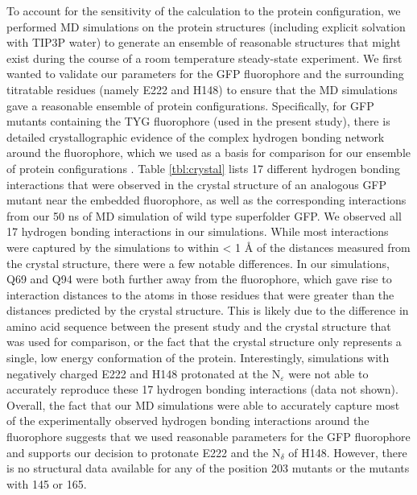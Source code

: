 To account for the sensitivity of the calculation to the protein configuration, we performed MD simulations on the protein structures (including explicit solvation with TIP3P water) to generate an ensemble of reasonable structures that might exist during the course of a room temperature steady-state experiment.
We first wanted to validate our parameters for the GFP fluorophore and the surrounding titratable residues (namely E222 and H148) to ensure that the MD simulations gave a reasonable ensemble of protein configurations.
Specifically, for GFP mutants containing the TYG fluorophore (used in the present study), there is detailed crystallographic evidence of the complex hydrogen bonding network around the fluorophore, which we used as a basis for comparison for our ensemble of protein configurations \cite{Elsliger1999}.
Table \ref{tbl:crystal} lists 17 different hydrogen bonding interactions that were observed in the crystal structure of an analogous GFP mutant near the embedded fluorophore, as well as the corresponding interactions from our 50 \si{\ns} of MD simulation of wild type superfolder GFP.
We observed all 17 hydrogen bonding interactions in our simulations.
While most interactions were captured by the simulations to within < 1 \si{\angstrom} of the distances measured from the crystal structure, there were a few notable differences.
In our simulations, Q69 and Q94 were both further away from the fluorophore, which gave rise to interaction distances to the atoms in those residues that were greater than the distances predicted by the crystal structure.
This is likely due to the difference in amino acid sequence between the present study and the crystal structure that was used for comparison, or the fact that the crystal structure only represents a single, low energy conformation of the protein.
Interestingly, simulations with negatively charged E222 and H148 protonated at the N$_{\varepsilon}$ were not able to accurately reproduce these 17 hydrogen bonding interactions (data not shown).
Overall, the fact that our MD simulations were able to accurately capture most of the experimentally observed hydrogen bonding interactions around the fluorophore suggests that we used reasonable parameters for the GFP fluorophore and supports our decision to protonate E222 and the N$_\delta$ of H148.
However, there is no structural data available for any of the position 203 mutants or the mutants with \pCNF{} 145 or 165.

